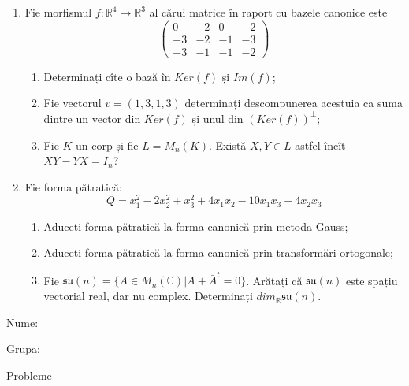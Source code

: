 \documentclass{article}
\begin{document}
\begin{enumerate}
 \item Fie morfismul $f:\mathbb{R}^4 \to \mathbb{R}^3$ al cărui matrice în raport cu bazele canonice este
$$\begin{pmatrix}
0&-2&0&-2\\
-3&-2&-1&-3\\
-3&-1&-1&-2
\end{pmatrix}$$

\begin{enumerate}
\item Determinați cîte o bază în $Ker(f)$ și $Im(f)$;
\item Fie vectorul $v=(1,3,1,3)$ determinați descompunerea acestuia ca suma dintre un vector din $Ker(f)$ și unul din $(Ker(f))^\perp$;
\item Fie $K$ un corp și fie $L=M_n(K)$. Există $X,Y \in L$ astfel încît $XY-YX=I_n$?  
\end{enumerate}
\item Fie forma pătratică:
$$Q= x_1^2-2x_2^2+x_3^2+4x_1x_2-10x_1x_3+4x_2x_3$$

\begin{enumerate}
\item Aduceți forma pătratică la forma canonică prin metoda Gauss;
\item Aduceți forma pătratică la forma canonică prin transformări ortogonale;
\item Fie $\mathfrak{su}(n)=\{ A \in M_n(\mathbb{C}) | A+\bar{A}^t=0\}$. Arătați că $\mathfrak{su}(n)$ este spațiu vectorial real, dar nu complex.
Determinați $dim_{\mathbb{R}}\mathfrak{su}(n)$.
\end{enumerate}
\end{enumerate}
\newpage
\begin{flushright}
Nume:\_\_\_\_\_\_\_\_\_\_\_\_\_\_
 
 
Grupa:\_\_\_\_\_\_\_\_\_\_\_\_\_\_
\end{flushright}
\begin{center}
\vspace{2cm}
{\Large Probleme}
\vspace{2cm}
\end{center}
\end{document}
